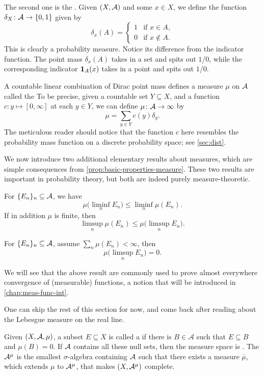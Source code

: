 The second one is the . Given $(X,\mathcal{A})$ and some $x\in X$, we define the function $\delta_X\colon \mathcal{A} \to \{0,1\}$ given by \[
    \delta_x(A) = \begin{cases}
        1 & \text{if } x \in A, \\
        0 & \text{if } x \not\in A.
    \end{cases}
\]
This is clearly a probability measure. Notice its difference from the indicator function. The point mass $\delta_x(A)$ takes in a set and spits out $1$/$0$, while the corresponding indicator $\mathbf{1}_A(x)$ takes in a point and spits out $1$/$0$.

A countable linear combination of Dirac point mass defines a measure $\mu$ on $\mathcal{A}$ called the  To be precise, given a countable set $Y \subseteq X$, and a function $c\colon y \mapsto [0,\infty]$ at each $y \in Y$, we can define $\mu\colon \mathcal{A} \to \infty$ by \[
    \mu = \sum_{y \in Y} c(y)\delta_y.
\] The meticulous reader should notice that the function $c$ here resembles the probability mass function on a discrete probability space; see \cref{sec:dist}.

We now introduce two additional elementary results about measures, which are simple consequences from \cref{prop:basic-properties-measure}. These two results are important in probability theory, but both are indeed purely measure-theoretic.
\begin{cor}
    For $\{E_n\}_n \subseteq \mathcal{A}$, we have \[
        \mu\bigl(\liminf_n E_n\bigr) \leq \liminf_n \mu(E_n).
    \]
    If in addition $\mu$ is finite, then \[
        \limsup_n \mu(E_n) \leq \mu\bigl(\limsup_n E_n\bigr).
    \]
\end{cor}

\begin{namedthm} \label{thm:BorelCantelli-meas-th}
    For $\{E_n\}_n \subseteq \mathcal{A}$, assume $\sum_{n} \mu(E_n) <\infty$, then \[
        \mu\bigl(\limsup_n E_n\bigr) = 0.
    \]
\end{namedthm}

We will see that the above result are commonly used to prove almost everywhere convergence of (measurable) functions, a notion that will be introduced in \cref{chap:meas-func-int}.

One can skip the rest of this section for now, and come back after reading about the Lebesgue measure on the real line.

Given $(X,\mathcal{A},\mu)$, a subset $E\subseteq X$ is called a 
if there is $B\in\mathcal{A}$ such that $E\subseteq B$ and $\mu(B)=0$.
If $\mathcal{A}$ contains all these null sets, then the measure space is .
The  $\mathcal{A}^\mu$ is the smallest $\sigma$-algebra containing $\mathcal{A}$ such that there exists a measure $\bar{\mu}$, which extends $\mu$ to $\mathcal{A}^\mu$, that makes $(X,\mathcal{A}^\mu)$ complete.

